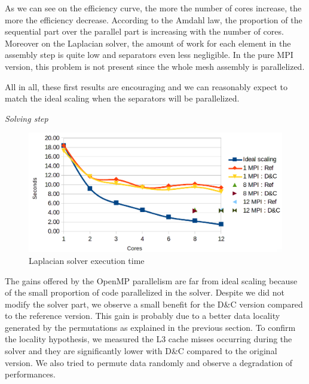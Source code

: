 \documentclass{IOS-Book-Article}
\begin{document}
As we can see on the efficiency curve, the more the number of cores increase, the more the efficiency decrease. According to the Amdahl law,
the proportion of the sequential part over the parallel part is increasing with the number of cores. Moreover on the Laplacian solver, the amount of work for each
element in the assembly step is quite low and separators even less negligible. In the pure MPI version, this problem is not present since the whole mesh assembly is parallelized.

All in all, these first results are encouraging and we can reasonably expect to match the ideal scaling when the separators will be parallelized.

\emph{Solving step}
\begin{figure}[htp]
 \centering
 \label{fig7}
 \includegraphics[scale=0.2]{Laplacian_solver_time.png}
 \caption{Laplacian solver execution time}
\end{figure}
The gains offered by the OpenMP parallelism are far from ideal scaling because of the small proportion of code parallelized in the solver.
Despite we did not modify the solver part, we observe a small benefit for the D\&C version compared to the reference version.
This gain is probably due to a better data locality generated by the permutations as explained in the previous section.
To confirm the locality hypothesis, we measured the L3 cache misses occurring during the solver and they are significantly lower with D\&C compared to the original version.
We also tried to permute data randomly and observe a degradation of performances.
\end{document}
